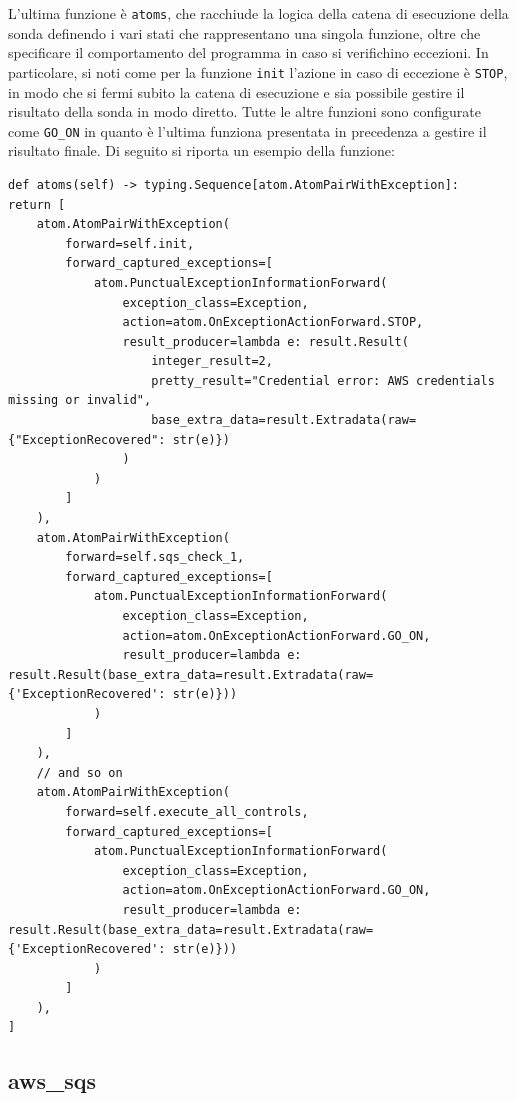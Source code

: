 L'ultima funzione è \texttt{atoms}, che racchiude la logica della catena di esecuzione della sonda definendo i vari stati che rappresentano una singola funzione, oltre che specificare il comportamento del programma in caso si verifichino eccezioni. In particolare, si noti come per la funzione \texttt{init} l'azione in caso di eccezione è \texttt{STOP}, in modo che si fermi subito la catena di esecuzione e sia possibile gestire il risultato della sonda in modo diretto. Tutte le altre funzioni sono configurate come \texttt{GO\_ON} in quanto è l'ultima funziona presentata in precedenza a gestire il risultato finale. Di seguito si riporta un esempio della funzione:

\begin{lstlisting}[style=mypython, caption={Funzione \texttt{atoms} per la definizione della catena di esecuzione della sonda}]
def atoms(self) -> typing.Sequence[atom.AtomPairWithException]:
return [
    atom.AtomPairWithException(
        forward=self.init,
        forward_captured_exceptions=[
            atom.PunctualExceptionInformationForward(
                exception_class=Exception,
                action=atom.OnExceptionActionForward.STOP,
                result_producer=lambda e: result.Result(
                    integer_result=2,
                    pretty_result="Credential error: AWS credentials missing or invalid",
                    base_extra_data=result.Extradata(raw={"ExceptionRecovered": str(e)})
                )
            )
        ]
    ),
    atom.AtomPairWithException(
        forward=self.sqs_check_1,
        forward_captured_exceptions=[
            atom.PunctualExceptionInformationForward(
                exception_class=Exception,
                action=atom.OnExceptionActionForward.GO_ON,
                result_producer=lambda e: result.Result(base_extra_data=result.Extradata(raw={'ExceptionRecovered': str(e)}))
            )
        ]
    ),
    // and so on 
    atom.AtomPairWithException(
        forward=self.execute_all_controls,
        forward_captured_exceptions=[
            atom.PunctualExceptionInformationForward(
                exception_class=Exception,
                action=atom.OnExceptionActionForward.GO_ON,
                result_producer=lambda e: result.Result(base_extra_data=result.Extradata(raw={'ExceptionRecovered': str(e)}))
            )
        ]
    ),
]
\end{lstlisting}

\subsection{aws\_sqs}
\label{sec:sqs}

